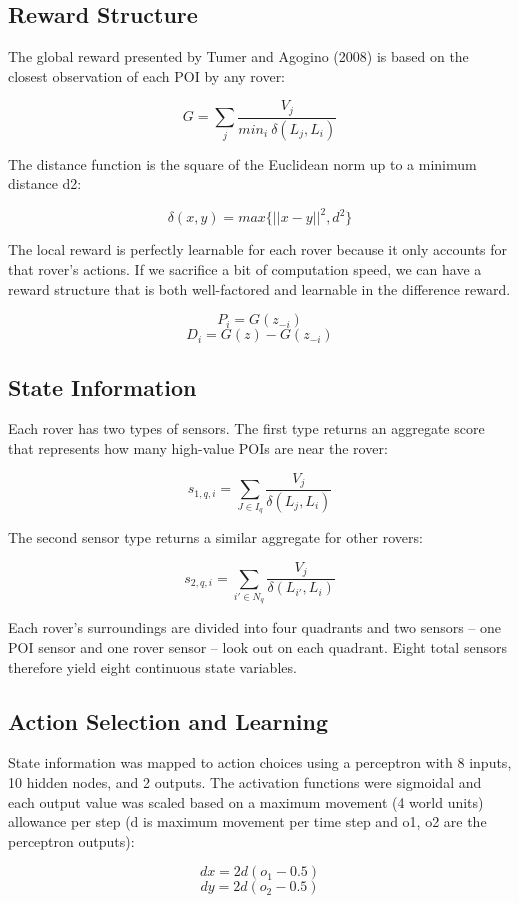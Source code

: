 \documentclass[letterpaper, 10 pt, conference]{ieeeconf}  %
\begin{document}
\subsection{Reward Structure}
The global reward presented by Tumer and Agogino (2008) is based on
the closest observation of each POI by any rover:
  
\[
G= \sum_j  \frac{V_j}{min_i \: \delta(L_j, L_i)}
\]

The distance function is the square of the Euclidean norm up to a
minimum distance d2:

\[
\delta  (x,y) = max \big\{||x - y||^2, d^2 \big\}    
\]

The local reward is perfectly learnable for each rover because it only accounts for that rover's actions. If we sacrifice a bit of computation speed, we can have a reward structure that is both well-factored and learnable in the difference reward.

\[
P_i=G(z_{-i})
\]
\[
D_i=G(z)-G(z_{-i})
\]

\subsection{State Information}
Each rover has two types of sensors. The first type returns an
aggregate score that represents how many high-value POIs are near the
rover:

\[
s_{1,q,i} =  \sum_{J \in I_q}  \frac{V_j}{\delta (L_j, L_i)} 
\]

The second sensor type returns a similar aggregate for other rovers:

\[
s_{2,q,i} =  \sum_{i' \in N_q}  \frac{V_j}{\delta (L_{i'}, L_i)}  
\]

Each rover’s surroundings are divided into four quadrants and two
sensors -- one POI sensor and one rover sensor -- look out on each
quadrant. Eight total sensors therefore yield eight continuous state
variables.

\subsection{Action Selection and Learning}
State information was mapped to action choices using a perceptron with
8 inputs, 10 hidden nodes, and 2 outputs. The activation functions
were sigmoidal and each output value was scaled based on a maximum
movement (4 world units) allowance per step (d is maximum movement per time step and
o1, o2 are the perceptron outputs):

\[
dx = 2d(o_1-0.5)
\]
\[
dy = 2d(o_2-0.5)
\]
\end{document}

